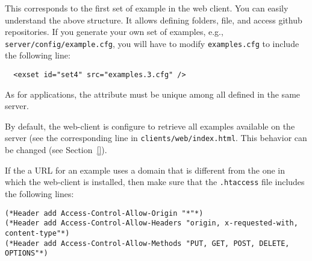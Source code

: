 \medskip
\noindent
This corresponds to the first set of example in the web client. You
can easily understand the above structure. It allows defining folders,
file, and access github repositories. If you generate your own set of
examples, e.g., \texttt{server/config/example.cfg}, you will have to
modify \texttt{examples.cfg} to include the following line:

\medskip
\begin{lstlisting}
  <exset id="set4" src="examples.3.cfg" />
\end{lstlisting}

\medskip
\indent
As for applications, the  attribute must be unique among all
 defined in the same server.

By default, the web-client is configure to retrieve all examples
available on the server (see the corresponding line in
\texttt{clients/web/index.html}. This behavior can be changed (see
Section~\ref{}).

If the a URL for an example uses a domain that is different from the
one in which the web-client is installed, then make sure that the
\texttt{.htaccess} file includes the following lines:

\begin{lstlisting}
(*Header add Access-Control-Allow-Origin "*"*)
(*Header add Access-Control-Allow-Headers "origin, x-requested-with, content-type"*)
(*Header add Access-Control-Allow-Methods "PUT, GET, POST, DELETE, OPTIONS"*)
\end{lstlisting}
